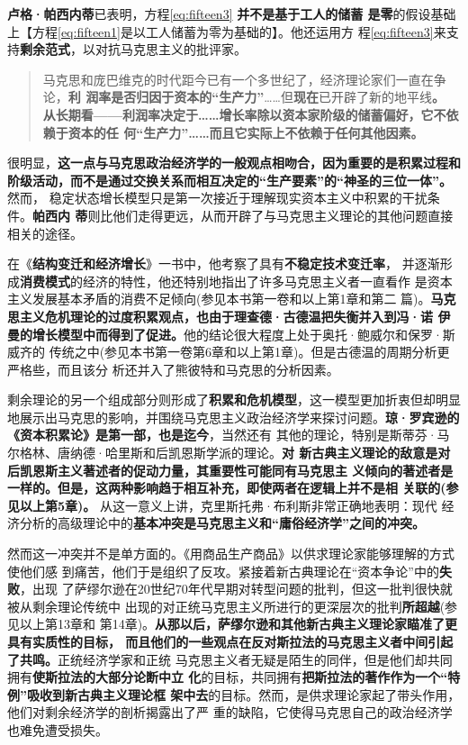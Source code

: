\textbf{卢格·帕西内蒂}已表明，方程\eqref{eq:fifteen3} \textbf{并不是基于工人的储蓄
  是零}的假设基础上【方程\eqref{eq:fifteen1}是以工人储蓄为零为基础的】。他还运用方
程\eqref{eq:fifteen3}来支持\textbf{剩余范式}，以对抗马克思主义的批评家。
\begin{quotation}
  马克思和庞巴维克的时代距今已有一个多世纪了，经济理论家们一直在争论，\textbf{利
    润率是否归因于资本的“生产力”}……但\textbf{现在}已开辟了新的地平线\textbf{。
    从长期看——利润率决定于……增长率除以资本家阶级的储蓄偏好，它不依赖于资本的任
    何“生产力”……而且它实际上不依赖于任何其他因素。}
\end{quotation}
很明显，\textbf{这一点与马克思政治经济学的一般观点相吻合，因为重要的是积累过程和
  阶级活动，而不是通过交换关系而相互决定的“生产要素”的“神圣的三位一体”。}然而，
稳定状态增长模型只是第一次接近于理解现实资本主义中积累的干扰条件。\textbf{帕西内
  蒂}则比他们走得更远，从而开辟了与马克思主义理论的其他问题直接相关的途径。

在《\textbf{结构变迁和经济增长}》一书中，他考察了具有\textbf{不稳定技术变迁率}，
并逐渐形成\textbf{消费模式}的经济的特性，他还特别地指出了许多马克思主义者一直看作
是资本主义发展基本矛盾的消费不足倾向(参见本书第一卷和以上第1章和第二
篇)。\textbf{马克思主义危机理论的过度积累观点，也由于理查德·古德温把失衡并入到冯·诺
  伊曼的增长模型中而得到了促进。}他的结论很大程度上处于奥托·鲍威尔和保罗·斯威齐的
传统之中(参见本书第一卷第6章和以上第1章)。但是古德温的周期分析更严格些，而且该分
析还并入了熊彼特和马克思的分析因素。

剩余理论的另一个组成部分则形成了\textbf{积累和危机模型}，这一模型更加折衷但却明显
地展示出马克思的影响，并围绕马克思主义政治经济学来探讨问题。\textbf{琼·罗宾逊的
  《资本积累论》是第一部，也是迄今}，当然还有
其他的理论，特别是斯蒂芬·马尔格林、唐纳德·哈里斯和后凯恩斯学派的理论。\textbf{对
  新古典主义理论的敌意是对后凯恩斯主义著述者的促动力量，其重要性可能同有马克思主
  义倾向的著述者是一样的。但是，这两种影响趋于相互补充，即使两者在逻辑上并不是相
  关联的(参见以上第5章)。} 从这一意义上讲，克里斯托弗·布利斯非常正确地表明：现代
经济分析的高级理论中的\textbf{基本冲突是马克思主义和“庸俗经济学”之间的冲突。}

然而这一冲突并不是单方面的。《用商品生产商品》以供求理论家能够理解的方式使他们感
到痛苦，他们于是组织了反攻。紧接着新古典理论在“资本争论”中的\textbf{失败}，出现
了萨缪尔逊在20世纪70年代早期对转型问题的批判，但这一批判很快就被从剩余理论传统中
出现的对正统马克思主义所进行的更深层次的批判\textbf{所超越}(参见以上第13章和
第14章)。\textbf{从那以后，萨缪尔逊和其他新古典主义理论家瞄准了更具有实质性的目标，
  而且他们的一些观点在反对斯拉法的马克思主义者中间引起了共鸣。}正统经济学家和正统
马克思主义者无疑是陌生的同伴，但是他们却共同拥有\textbf{使斯拉法的大部分论断中立
  化}的目标，共同拥有\textbf{把斯拉法的著作作为一个“特例”吸收到新古典主义理论框
  架中去}的目标。然而，是供求理论家起了带头作用，他们对剩余经济学的剖析揭露出了严
重的缺陷，它使得马克思自己的政治经济学也难免遭受损失。

